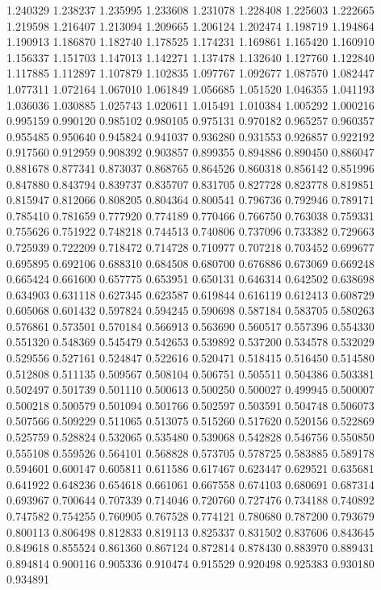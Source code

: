 1.240329
1.238237
1.235995
1.233608
1.231078
1.228408
1.225603
1.222665
1.219598
1.216407
1.213094
1.209665
1.206124
1.202474
1.198719
1.194864
1.190913
1.186870
1.182740
1.178525
1.174231
1.169861
1.165420
1.160910
1.156337
1.151703
1.147013
1.142271
1.137478
1.132640
1.127760
1.122840
1.117885
1.112897
1.107879
1.102835
1.097767
1.092677
1.087570
1.082447
1.077311
1.072164
1.067010
1.061849
1.056685
1.051520
1.046355
1.041193
1.036036
1.030885
1.025743
1.020611
1.015491
1.010384
1.005292
1.000216
0.995159
0.990120
0.985102
0.980105
0.975131
0.970182
0.965257
0.960357
0.955485
0.950640
0.945824
0.941037
0.936280
0.931553
0.926857
0.922192
0.917560
0.912959
0.908392
0.903857
0.899355
0.894886
0.890450
0.886047
0.881678
0.877341
0.873037
0.868765
0.864526
0.860318
0.856142
0.851996
0.847880
0.843794
0.839737
0.835707
0.831705
0.827728
0.823778
0.819851
0.815947
0.812066
0.808205
0.804364
0.800541
0.796736
0.792946
0.789171
0.785410
0.781659
0.777920
0.774189
0.770466
0.766750
0.763038
0.759331
0.755626
0.751922
0.748218
0.744513
0.740806
0.737096
0.733382
0.729663
0.725939
0.722209
0.718472
0.714728
0.710977
0.707218
0.703452
0.699677
0.695895
0.692106
0.688310
0.684508
0.680700
0.676886
0.673069
0.669248
0.665424
0.661600
0.657775
0.653951
0.650131
0.646314
0.642502
0.638698
0.634903
0.631118
0.627345
0.623587
0.619844
0.616119
0.612413
0.608729
0.605068
0.601432
0.597824
0.594245
0.590698
0.587184
0.583705
0.580263
0.576861
0.573501
0.570184
0.566913
0.563690
0.560517
0.557396
0.554330
0.551320
0.548369
0.545479
0.542653
0.539892
0.537200
0.534578
0.532029
0.529556
0.527161
0.524847
0.522616
0.520471
0.518415
0.516450
0.514580
0.512808
0.511135
0.509567
0.508104
0.506751
0.505511
0.504386
0.503381
0.502497
0.501739
0.501110
0.500613
0.500250
0.500027
0.499945
0.500007
0.500218
0.500579
0.501094
0.501766
0.502597
0.503591
0.504748
0.506073
0.507566
0.509229
0.511065
0.513075
0.515260
0.517620
0.520156
0.522869
0.525759
0.528824
0.532065
0.535480
0.539068
0.542828
0.546756
0.550850
0.555108
0.559526
0.564101
0.568828
0.573705
0.578725
0.583885
0.589178
0.594601
0.600147
0.605811
0.611586
0.617467
0.623447
0.629521
0.635681
0.641922
0.648236
0.654618
0.661061
0.667558
0.674103
0.680691
0.687314
0.693967
0.700644
0.707339
0.714046
0.720760
0.727476
0.734188
0.740892
0.747582
0.754255
0.760905
0.767528
0.774121
0.780680
0.787200
0.793679
0.800113
0.806498
0.812833
0.819113
0.825337
0.831502
0.837606
0.843645
0.849618
0.855524
0.861360
0.867124
0.872814
0.878430
0.883970
0.889431
0.894814
0.900116
0.905336
0.910474
0.915529
0.920498
0.925383
0.930180
0.934891
